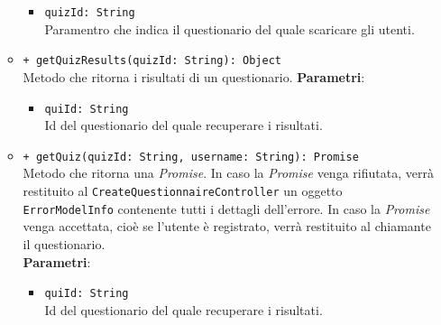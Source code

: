 \begin{itemize}
\begin{itemize}
\begin{itemize}
		\item \texttt{quizId: String} \\ Paramentro che indica il questionario del quale scaricare gli utenti.
	\end{itemize}
	\item \texttt{+ getQuizResults(quizId: String): Object} \\ Metodo che ritorna i risultati di un questionario.
	\textbf{Parametri}:
	\begin{itemize}
		\item \texttt{quiId: String} \\ Id del questionario del quale recuperare i risultati.
	\end{itemize}
	\item \texttt{+ getQuiz(quizId: String, username: String): Promise} \\ Metodo che ritorna una \textit{Promise}. In caso la \textit{Promise} venga rifiutata, verrà restituito al \texttt{CreateQuestionnaireController} un oggetto \texttt{ErrorModelInfo} contenente tutti i dettagli dell'errore. In caso la \textit{Promise} venga accettata, cioè se l'utente è registrato, verrà restituito al chiamante il questionario. \\
	\textbf{Parametri}:
	\begin{itemize}
		\item \texttt{quiId: String} \\ Id del questionario del quale recuperare i risultati.
	\end{itemize}
\end{itemize}
\end{itemize}